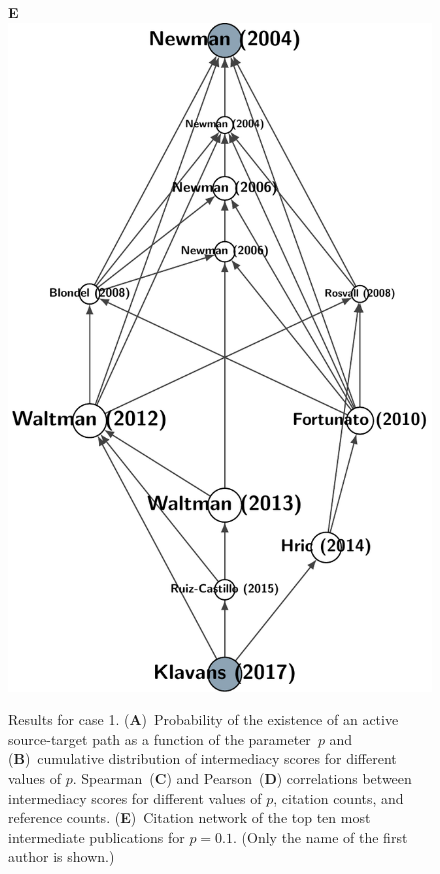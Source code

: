 \documentclass[9pt,twocolumn,twoside]{pnas-alt} %
\theoremstyle{definition}
\begin{document}
\begin{sansmath}
\begin{figure}
\begin{minipage}{7.4cm}
  \end{minipage}\linewidth%
  \begin{minipage}{4cm}
    \vskip16pt\hskip16pt\textbf{\textsf{\footnotesize E}}\\\vskip-32pt%
    \includegraphics[width=\linewidth]{example_Q}
  \end{minipage}
  \caption{Results for case 1. (\textbf{A})~Probability of the existence of an active source-target path as a function of the parameter~$p$ and (\textbf{B})~cumulative distribution of intermediacy scores for different values of $p$. Spearman~(\textbf{C}) and Pearson~(\textbf{D}) correlations between intermediacy scores for different values of $p$, citation counts, and reference counts. (\textbf{E})~Citation network of the top ten most intermediate publications for $p = 0.1$. (Only the name of the first author is shown.)}
  \label{fig:Q}
\end{figure}\end{sansmath}
\end{document}
